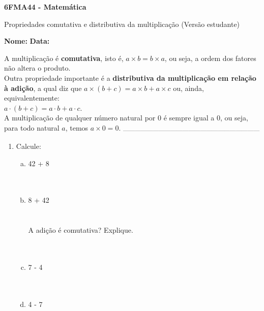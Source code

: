 \documentclass[a4paper,14pt]{article}
\begin{document}
	
	\noindent\textbf{6FMA44 - Matemática} 
	
	\begin{center}Propriedades comutativa e distributiva da multiplicação (Versão estudante)
	\end{center}
	
	\noindent\textbf{Nome:} \underline{\hspace{10cm}}
	\noindent\textbf{Data:} \underline{\hspace{4cm}}
	
	\begin{multicols}{2}
		\noindent A multiplicação é \textbf{comutativa}, isto é, $a \times b = b \times a$, ou seja, a ordem dos fatores não altera o produto. \\
		Outra propriedade importante é a \textbf{distributiva da multiplicação em relação à adição}, a qual diz que $a \times (b + c) = a \times b + a \times c$ ou, ainda, equivalentemente: \\ $a \cdot (b + c) = a \cdot b + a \cdot c$. \\
		A multiplicação de qualquer número natural por 0 é sempre igual a 0, ou seja, para todo natural $a$, temos $a \times 0 = 0$.
	\textsubscript{---------------------------------------------------------------------}
    	\begin{enumerate}
    		\item Calcule: \\
    		\begin{enumerate}[a)]
    			\item 42 + 8 \\\\\\
    			\item 8 + 42 \\\\\\
    			A adição é comutativa? Explique. \\\\\\
    			\item 7 - 4 \\\\\\
    			\item 4 - 7 \\\\\\

\end{enumerate}
\end{enumerate}
\end{multicols}
\end{document}
